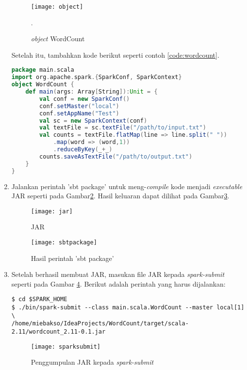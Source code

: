 \begin{enumerate}
\begin{figure}[H]
    \centering  
    \texttt{[image: object]}  
    \caption[\textit{object} WordCount]{\textit{object} WordCount}.
    \label{fig:object} 
\end{figure}


Setelah itu, tambahkan kode berikut seperti contoh \ref{code:wordcount}.

\begin{lstlisting}[language=Scala, caption=WordCount.scala, label={code:wordcount}]
package main.scala
import org.apache.spark.{SparkConf, SparkContext}
object WordCount {
    def main(args: Array[String]):Unit = {
        val conf = new SparkConf()
        conf.setMaster("local")
        conf.setAppName("Test")
        val sc = new SparkContext(conf)
        val textFile = sc.textFile("/path/to/input.txt")
        val counts = textFile.flatMap(line => line.split(" "))
            .map(word => (word,1))
            .reduceByKey(_+_)
        counts.saveAsTextFile("/path/to/output.txt")
    }
}
\end{lstlisting}

\item Jalankan perintah 'sbt package' untuk meng-\textit{compile} kode menjadi \textit{executable} JAR seperti pada Gambar\ref{fig:jar}. Hasil keluaran dapat dilihat pada Gambar\ref{fig:sbtpackage}.

\begin{figure}[H]
    \centering  
    \texttt{[image: jar]}  
    \caption[JAR]{JAR} 
    \label{fig:jar} 
\end{figure}

\begin{figure}[H]
    \centering  
    \texttt{[image: sbtpackage]}  
    \caption[Hasil perintah 'sbt package']{Hasil perintah 'sbt package'} 
    \label{fig:sbtpackage} 
\end{figure}

\item Setelah berhasil membuat JAR, masukan file JAR kepada \textit{spark-submit} seperti pada Gambar \ref{fig:sparksubmit}. Berikut adalah perintah yang harus dijalankan: 

\begin{verbatim}
$ cd $SPARK_HOME
$ ./bin/spark-submit --class main.scala.WordCount --master local[1] \
/home/miebakso/IdeaProjects/WordCount/target/scala-2.11/wordcount_2.11-0.1.jar 
\end{verbatim}

\begin{figure}[H]
    \centering  
    \texttt{[image: sparksubmit]}  
    \caption[Penggumpulan JAR kepada \textit{spark-submit}]{Penggumpulan JAR kepada \textit{spark-submit}} 
    \label{fig:sparksubmit} 
\end{figure}


\end{enumerate}
